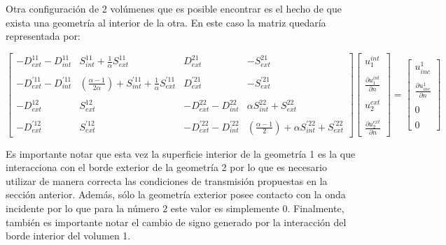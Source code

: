 \documentclass[12pt,letterpaper]{article}
\numberwithin{equation}{section}
\begin{document}
Otra configuración de 2 volúmenes que es posible encontrar es el hecho de que exista una geometría al interior de la otra. En este caso la matriz quedaría representada por:

\begin{equation} 
\begin{bmatrix}
-D_{ext}^{11} - D_{int}^{11} & S_{int}^{11} + \frac{1}{\alpha}S_{ext}^{11} & D_{ext}^{21} & -S_{ext}^{21} \\
\\
-D_{ext}^{'11} - D_{int}^{'11} & (\frac{\alpha - 1}{2\alpha})+ S_{int}^{'11} + \frac{1}{\alpha}S_{ext}^{'11} & D_{ext}^{'21} & -S_{ext}^{'21}\\
\\
-D_{ext}^{12} & S_{ext}^{12} & -D_{ext}^{22} - D_{int}^{22} & \alpha S_{int}^{22} + S_{ext}^{22}\\
\\
-D_{ext}^{'12} & S_{ext}^{'12} & -D_{ext}^{'22} - D_{int}^{'22} & (\frac{\alpha - 1}{2})+\alpha S_{int}^{'22} + S_{ext}^{'22}
\end{bmatrix}
\begin{bmatrix}
u^{int}_1\\
\\
\frac{\partial u^{int}_1}{\partial n}\\
\\
u^{ext}_2\\
\\
\frac{\partial u^{ext}_2}{\partial n}
\end{bmatrix}
=
\begin{bmatrix}
u_{inc}^1\\
\\
\frac{\partial u_{inc}^1}{\partial n}\\
\\
0\\
\\
0
\end{bmatrix}
\label{eq:multi2_matriz int}		 
\end{equation} 

Es importante notar que esta vez la superficie interior de la geometría 1 es la que interacciona con el borde exterior de la geometría 2 por lo que es necesario utilizar de manera correcta las condiciones de transmisión propuestas en la sección anterior. Además, sólo la geometría exterior posee contacto con la onda incidente por lo que para la número 2 este valor es simplemente 0. Finalmente, también es importante notar el cambio de signo generado por la interacción del borde interior del volumen 1.
\end{document}
